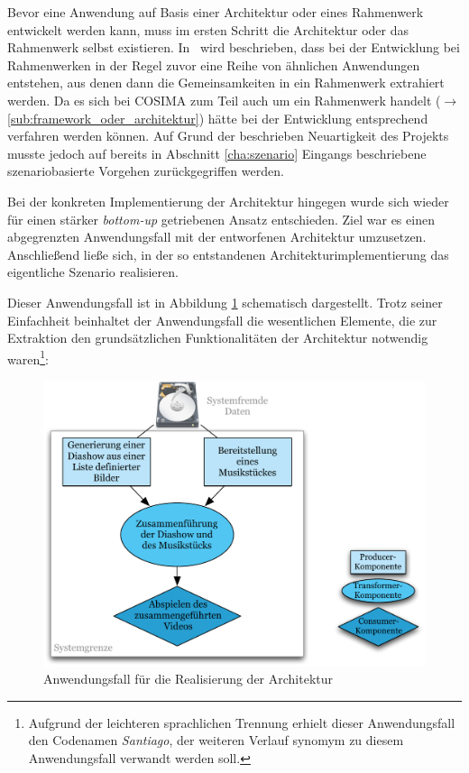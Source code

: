   Bevor eine Anwendung auf Basis einer Architektur oder eines Rahmenwerk entwickelt werden kann, muss im ersten Schritt die Architektur oder das Rahmenwerk selbst existieren. In~\citep{handbuch_der_software_architektur} wird beschrieben, dass bei der Entwicklung bei Rahmenwerken in der Regel zuvor eine Reihe von ähnlichen Anwendungen entstehen, aus denen dann die Gemeinsamkeiten in ein Rahmenwerk extrahiert werden. Da es sich bei COSIMA zum Teil auch um ein Rahmenwerk handelt ($\to$ \ref{sub:framework_oder_architektur}) hätte bei der Entwicklung entsprechend verfahren werden können. Auf Grund der beschrieben Neuartigkeit des Projekts musste jedoch auf bereits in Abschnitt \ref{cha:szenario} Eingangs beschriebene szenariobasierte Vorgehen zurückgegriffen werden.
  
  Bei der konkreten Implementierung der Architektur hingegen wurde sich wieder für einen stärker \emph{bottom-up} getriebenen Ansatz entschieden. Ziel war es einen abgegrenzten Anwendungsfall mit der entworfenen Architektur umzusetzen. Anschließend ließe sich, in der so entstandenen Architekturimplementierung das eigentliche Szenario realisieren.
  
  Dieser Anwendungsfall ist in Abbildung \ref{fig:images_Santiago_Anwendungsfall} schematisch dargestellt. Trotz seiner Einfachheit beinhaltet der Anwendungsfall die wesentlichen Elemente, die zur Extraktion den grundsätzlichen Funktionalitäten der Architektur notwendig waren\footnote{Aufgrund der leichteren sprachlichen Trennung erhielt dieser Anwendungsfall den Codenamen \emph{Santiago}, der weiteren Verlauf synomym zu diesem Anwendungsfall verwandt werden soll.}:
  
  \begin{figure}[ht]
    \centering
      \includegraphics[width=.9\textwidth]{images/Santiago_Anwendungsfall.pdf}
    \caption{Anwendungsfall für die Realisierung der Architektur}
    \label{fig:images_Santiago_Anwendungsfall}
  \end{figure}

